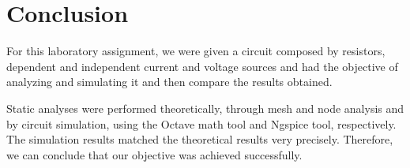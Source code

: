 
\section{Conclusion}
\label{sec:conclusion}


For this laboratory assignment, we were given a circuit composed by resistors, dependent
and independent current and voltage sources and had the objective of analyzing and simulating
it and then compare the results obtained.

Static analyses were performed theoretically, through mesh and node analysis and by circuit
simulation, using the Octave math tool and Ngspice tool, respectively. The simulation results
matched the theoretical results very precisely. Therefore, we can conclude that our objective
was achieved successfully.

